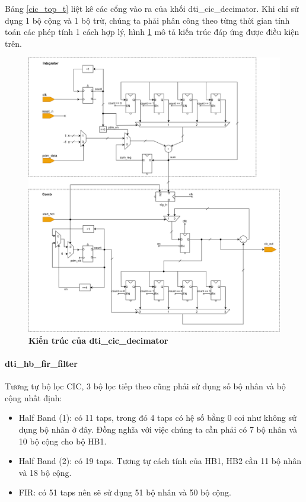 Bảng \ref{cic_top_t} liệt kê các cổng vào ra của khối dti\_cic\_decimator. Khi chỉ sử dụng 1 bộ cộng và 1 bộ trừ, chúng ta phải phân công theo từng thời gian tính toán các phép tính 1 cách hợp lý, hình \ref{cic_top_arc} mô tả kiến trúc đáp ứng được điều kiện trên.

\begin{figure}[H]
    \centering
    \includegraphics[width=16cm]{Images/Chuong4/cic/cic_top_arc.png}
    \caption[Kiến trúc của dti\_cic\_decimator]{\bfseries \fontsize{12pt}{0pt}\selectfont Kiến trúc của dti\_cic\_decimator}
    \label{cic_top_arc}
\end{figure}
 \paragraph{dti\_hb\_fir\_filter}
Tương tự bộ lọc CIC, 3 bộ lọc tiếp theo cũng phải sử dụng số bộ nhân và bộ cộng nhất định:
\begin{itemize}
    \item Half Band (1): có 11 taps, trong đó 4 taps có hệ số bằng 0 coi như không sử dụng bộ nhân ở đây. Đồng nghĩa với việc chúng ta cần phải có 7 bộ nhân và 10 bộ cộng cho bộ HB1.
     \item Half Band (2): có 19 taps. Tương tự cách tính của HB1, HB2 cần 11 bộ nhân và 18 bộ cộng.
     \item FIR: có 51 taps nên sẽ sử dụng 51 bộ nhân và 50 bộ cộng.
\end{itemize} 

